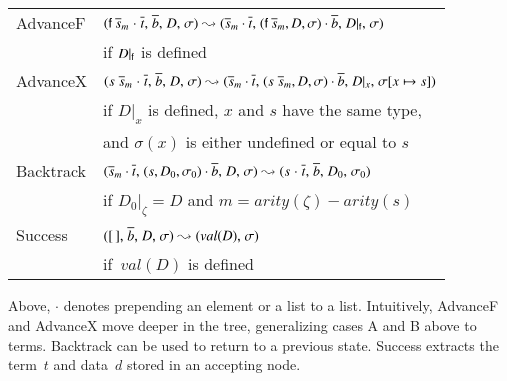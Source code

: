 \noindent
\begin{tabular}{ll}
  \textsf{AdvanceF} & $ ( \mathsf{f} \> \overline{s}_{m} \mathrel{\cdot} \overline{t}{,}\; \overline{b}{,}\; D{,}\; \sigma )
           \leadsto
           (\overline{s}_{m} \cdot \overline{t}{,}\;
           (\mathsf{f} \> \overline{s}_{m}, D, \sigma) \cdot \overline{b}{,}\; D{|}_{\mathsf{f}}{,}\; \sigma)
         $ \\
                   & if $D{|}_{\mathsf{f}}$ is defined \\[\jot]
  \textsf{AdvanceX} & $( s \; \overline{s}_{m} \mathrel{\cdot} \overline{t}{,}\; \overline{b}{,}\; D{,}\; \sigma ) 
                      \leadsto {} 
                      (\overline{s}_{m} \cdot \overline{t}{,}\; (s \; \overline{s}_{m}, D, \sigma) \cdot \overline{b}{,}\; D{|}_x{,}\; \sigma[x \mapsto s])$ \\
                    & if $D{|}_x$ is defined, $x$ and $s$ have the same type,\\ & and
                    $\sigma(x)$ is either undefined or equal to $s$ \\[\jot]
  \textsf{Backtrack} & $ ( \overline{s}_{m} \cdot \overline{t}{,}\; (s, D_0, \sigma_0) \cdot \overline{b}{,}\; D{,}\; \sigma)
                      \leadsto
                      (s \mathrel{\cdot} \overline{t}{,}\; \overline{b}{,}\; D_0{,}\; \sigma_0)$  \\
                      & if $D_0{|}_\zeta = D$ and $m = \textit{arity}(\zeta) - \textit{arity}(s)$ \\[\jot]
  \textsf{Success}    & $ ( [\,]{,}\; \overline{b}{,}\; D{,}\; \sigma ) \leadsto (\mathit{val}(D){,}\; \sigma)$ \\
                      & if~$\mathit{val}(D)$ is defined
\end{tabular}

Above, $\cdot$ denotes prepending an element or a list to a list.
%
Intuitively, \textsf{AdvanceF} and \textsf{AdvanceX} move deeper in
the tree, generalizing cases A and B above to \lfhol{} terms.
\textsf{Backtrack} can be used to return to a previous state.
\textsf{Success} extracts the term~$t$ and data~$d$ stored in
an accepting node.

\newcommand\BDTARROW[1]{\rlap{\ensuremath{\Pdtarrow_{#1}\;}}\phantom{\Pdtarrow_\textsf{AdvanceX}\;}}

